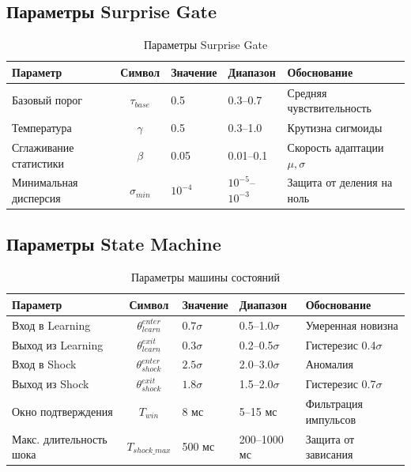 \subsection{Параметры Surprise Gate}

\begin{table}[h]
\centering
\caption{Параметры Surprise Gate}
\label{tab:hyper_surprise}
\begin{tabular}{lcp{2cm}p{2.5cm}p{4cm}}
\toprule
\textbf{Параметр} & \textbf{Символ} & \textbf{Значение} & \textbf{Диапазон} & \textbf{Обоснование} \\
\midrule
Базовый порог & $\tau_{base}$ & 0.5 & 0.3–0.7 & Средняя чувствительность \\
Температура & $\gamma$ & 0.5 & 0.3–1.0 & Крутизна сигмоиды \\
Сглаживание статистики & $\beta$ & 0.05 & 0.01–0.1 & Скорость адаптации $\mu, \sigma$ \\
Минимальная дисперсия & $\sigma_{min}$ & $10^{-4}$ & $10^{-5}$–$10^{-3}$ & Защита от деления на ноль \\
\bottomrule
\end{tabular}
\end{table}

\subsection{Параметры State Machine}

\begin{table}[h]
\centering
\caption{Параметры машины состояний}
\label{tab:hyper_fsm}
\begin{tabular}{lcp{2cm}p{2.5cm}p{4cm}}
\toprule
\textbf{Параметр} & \textbf{Символ} & \textbf{Значение} & \textbf{Диапазон} & \textbf{Обоснование} \\
\midrule
Вход в Learning & $\theta_{learn}^{enter}$ & $0.7\sigma$ & 0.5–1.0$\sigma$ & Умеренная новизна \\
Выход из Learning & $\theta_{learn}^{exit}$ & $0.3\sigma$ & 0.2–0.5$\sigma$ & Гистерезис 0.4$\sigma$ \\
Вход в Shock & $\theta_{shock}^{enter}$ & $2.5\sigma$ & 2.0–3.0$\sigma$ & Аномалия \\
Выход из Shock & $\theta_{shock}^{exit}$ & $1.8\sigma$ & 1.5–2.0$\sigma$ & Гистерезис 0.7$\sigma$ \\
Окно подтверждения & $T_{win}$ & 8 мс & 5–15 мс & Фильтрация импульсов \\
Макс. длительность шока & $T_{shock\_max}$ & 500 мс & 200–1000 мс & Защита от зависания \\
\bottomrule
\end{tabular}
\end{table}

